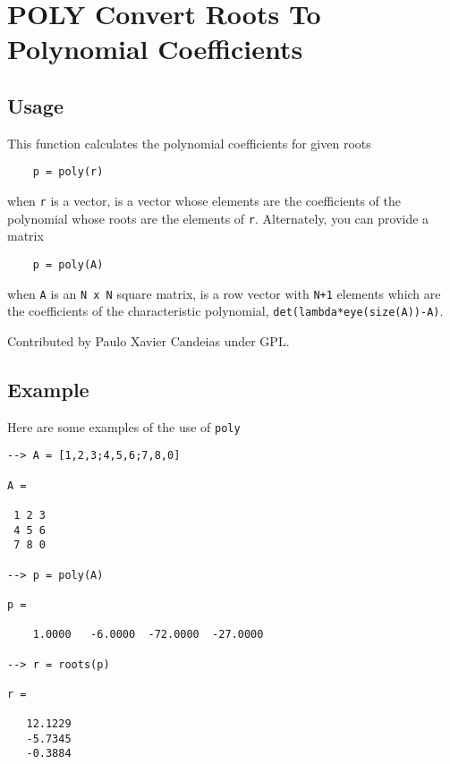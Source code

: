 \section{POLY Convert Roots To Polynomial Coefficients}

\subsection{Usage}

This function calculates the polynomial coefficients for given roots
\begin{verbatim}
    p = poly(r)
\end{verbatim}
when \verb|r| is a vector, is a vector whose elements are the coefficients 
of the polynomial whose roots are the elements of \verb|r|.  Alternately,
you can provide a matrix
\begin{verbatim}
    p = poly(A)
\end{verbatim}
when \verb|A| is an \verb|N x N| square matrix, is a row vector with 
\verb|N+1| elements which are the coefficients of the
characteristic polynomial, \verb|det(lambda*eye(size(A))-A)|.

Contributed by Paulo Xavier Candeias under GPL.
\subsection{Example}

Here are some examples of the use of \verb|poly|
\begin{verbatim}
--> A = [1,2,3;4,5,6;7,8,0]

A = 

 1 2 3 
 4 5 6 
 7 8 0 

--> p = poly(A)

p = 

    1.0000   -6.0000  -72.0000  -27.0000 

--> r = roots(p)

r = 

   12.1229 
   -5.7345 
   -0.3884 
\end{verbatim}
